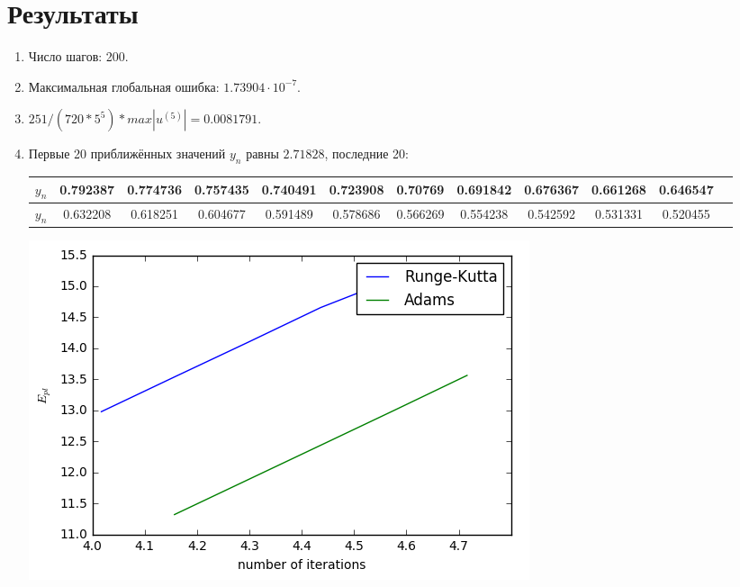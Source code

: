 \documentclass[10pt,a4paper,oneside,russian]{article}
\begin{document}
\section{Результаты}
\begin{enumerate}
  \item Число шагов: 200.
  \item Максимальная глобальная ошибка: $1.73904 \cdot 10^{-7}$.
  \item $251 / (720 * 5^5) * max|u^{(5)}| = 0.0081791$.
  \item Первые 20 приближённых значений $y_n$ равны $2.71828$, последние 20:

  \begin{tabular}{|c|c|c|c|c|c|c|c|c|c|c|c|}
    \hline
    $y_n$   &0.792387 & 0.774736 & 0.757435 & 0.740491 & 0.723908 & 0.70769 & 0.691842 & 0.676367 & 0.661268 & 0.646547\\\hline
    $y_n$ & 0.632208 & 0.618251 & 0.604677 & 0.591489 & 0.578686 & 0.566269 & 0.554238 & 0.542592 & 0.531331 & 0.520455\\\hline
  \end{tabular}

  \begin{center}
    \includegraphics[scale=0.60]{imp-graph.png}
  \end{center}

\end{enumerate}
\end{document}
